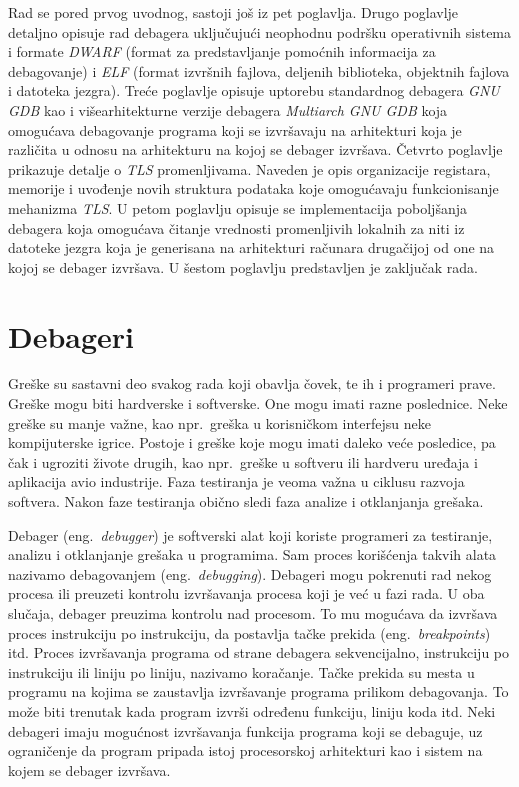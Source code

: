 \documentclass[12pt,oneside]{memoir}
\begin{document}
Rad se pored prvog uvodnog, sastoji još iz pet poglavlja. Drugo poglavlje detaljno opisuje rad debagera uključujući neophodnu podršku operativnih sistema i formate \emph{DWARF} (format za predstavljanje pomoćnih informacija za debagovanje) i \emph{ELF} (format izvršnih fajlova, deljenih biblioteka, objektnih fajlova i datoteka jezgra). Treće poglavlje opisuje uptorebu standardnog debagera \emph{GNU GDB} kao i višearhitekturne verzije debagera \emph{Multiarch GNU GDB} koja omogućava debagovanje programa koji se izvršavaju na arhitekturi koja je različita u odnosu na arhitekturu na kojoj se debager izvršava. Četvrto poglavlje prikazuje detalje o \emph{TLS} promenljivama. Naveden je opis organizacije registara, memorije i uvođenje novih struktura podataka koje omogućavaju funkcionisanje mehanizma \emph{TLS}. U petom poglavlju opisuje se implementacija poboljšanja debagera koja omogućava čitanje vrednosti promenljivih lokalnih za niti iz datoteke jezgra koja je generisana na arhitekturi računara drugačijoj od one na kojoj se debager izvršava. U šestom poglavlju predstavljen je zaključak rada.


\chapter{Debageri}
\label{chp:debageri}

Greške su sastavni deo svakog rada koji obavlja čovek, te ih i programeri prave. Greške mogu biti hardverske i softverske. One mogu imati razne poslednice. Neke greške su manje važne, kao npr.~greška u korisničkom interfejsu neke kompijuterske igrice. Postoje i greške koje mogu imati daleko veće posledice, pa čak i ugroziti živote drugih, kao npr.~greške u softveru ili hardveru uređaja i aplikacija avio industrije. Faza testiranja je veoma važna u ciklusu razvoja softvera. Nakon faze testiranja obično sledi faza analize i otklanjanja grešaka.

Debager (eng.~\emph{debugger}) je softverski alat koji koriste programeri za testiranje, analizu i otklanjanje grešaka u programima. Sam proces korišćenja takvih alata nazivamo debagovanjem (eng.~\emph{debugging}).
Debageri mogu pokrenuti rad nekog procesa ili preuzeti kontrolu izvršavanja procesa koji je već u fazi rada. U oba slučaja, debager preuzima kontrolu nad procesom. To mu mogućava da izvršava proces instrukciju po instrukciju, da postavlja tačke prekida (eng.~\emph{breakpoints}) itd. Proces izvršavanja programa od strane debagera sekvencijalno, instrukciju po instrukciju ili liniju po liniju, nazivamo koračanje. Tačke prekida su mesta u programu na kojima se zaustavlja izvršavanje programa prilikom debagovanja. To može biti trenutak kada program izvrši određenu funkciju, liniju koda itd. Neki debageri imaju mogućnost izvršavanja funkcija programa koji se debaguje, uz ograničenje da program pripada istoj procesorskoj arhitekturi kao i sistem na kojem se debager izvršava.
\end{document}
